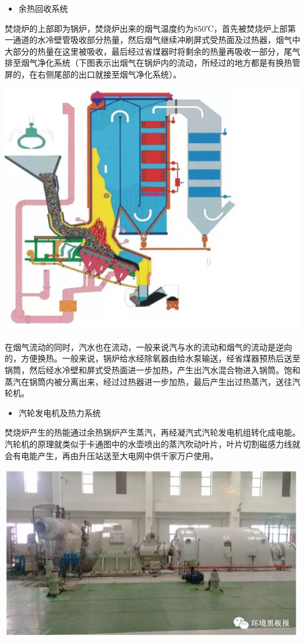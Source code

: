 \documentclass[
]{book}
\providecommand{\tightlist}{%
  \setlength{\itemsep}{0pt}\setlength{\parskip}{0pt}}
\begin{document}
\begin{itemize}
\tightlist
\item
  余热回收系统
\end{itemize}

焚烧炉的上部即为锅炉，焚烧炉出来的烟气温度约为850℃，首先被焚烧炉上部第一通道的水冷壁管吸收部分热量，然后烟气继续冲刷屏式受热面及过热器，烟气中大部分的热量在这里被吸收，最后经过省煤器时将剩余的热量再吸收一部分，尾气排至烟气净化系统（下图表示出烟气在锅炉内的流动，所经过的地方都是有换热管屏的，在右侧尾部的出口就接至烟气净化系统）。

\includegraphics[width=8.33in]{images/ljfs5}

在烟气流动的同时，汽水也在流动，一般来说汽与水的流动和烟气的流动是逆向的，方便换热。一般来说，锅炉给水经除氧器由给水泵输送，经省煤器预热后送至锅筒，然后经水冷壁和屏式受热面进一步加热，产生出汽水混合物进入锅筒。饱和蒸汽在锅筒内被分离出来，经过过热器进一步加热，最后产生出过热蒸汽，送往汽轮机。

\begin{itemize}
\tightlist
\item
  汽轮发电机及热力系统
\end{itemize}

焚烧炉产生的热能通过余热锅炉产生蒸汽，再经凝汽式汽轮发电机组转化成电能。汽轮机的原理就类似于卡通图中的水壶喷出的蒸汽吹动叶片，叶片切割磁感力线就会有电能产生，再由升压站送至大电网中供千家万户使用。

\includegraphics[width=8.33in]{images/ljfs6}
\end{document}
